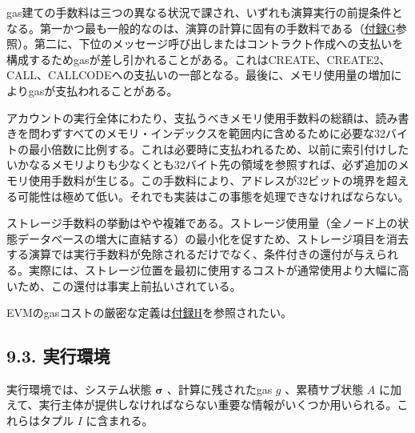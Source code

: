 \documentclass[
]{ltjsarticle}
\begin{document}
gas建ての手数料は三つの異なる状況で課され、いずれも演算実行の前提条件となる。第一かつ最も一般的なのは、演算の計算に固有の手数料である（\protect\hyperlink{app:fees}{付録G}参照）。第二に、下位のメッセージ呼び出しまたはコントラクト作成への支払いを構成するためgasが差し引かれることがある。これはCREATE、CREATE2、CALL、CALLCODEへの支払いの一部となる。最後に、メモリ使用量の増加によりgasが支払われることがある。

アカウントの実行全体にわたり、支払うべきメモリ使用手数料の総額は、読み書きを問わずすべてのメモリ・インデックスを範囲内に含めるために必要な32バイトの最小倍数に比例する。これは必要時に支払われるため、以前に索引付けしたいかなるメモリよりも少なくとも32バイト先の領域を参照すれば、必ず追加のメモリ使用手数料が生じる。この手数料により、アドレスが32ビットの境界を超える可能性は極めて低い。それでも実装はこの事態を処理できなければならない。

ストレージ手数料の挙動はやや複雑である。ストレージ使用量（全ノード上の状態データベースの増大に直結する）の最小化を促すため、ストレージ項目を消去する演算では実行手数料が免除されるだけでなく、条件付きの還付が与えられる。実際には、ストレージ位置を最初に使用するコストが通常使用より大幅に高いため、この還付は事実上前払いされている。

EVMのgasコストの厳密な定義は\protect\hyperlink{app:vm}{付録H}を参照されたい。

\protect\hypertarget{exec_env}{}{}

\hypertarget{ux5b9fux884cux74b0ux5883}{%
\subsection{9.3. 実行環境}\label{ux5b9fux884cux74b0ux5883}}

実行環境では、システム状態 \(\boldsymbol{\sigma}\) 、計算に残されたgas
\(g\) 、累積サブ状態 \(A\)
に加えて、実行主体が提供しなければならない重要な情報がいくつか用いられる。これらはタプル
\(I\) に含まれる。
\end{document}
